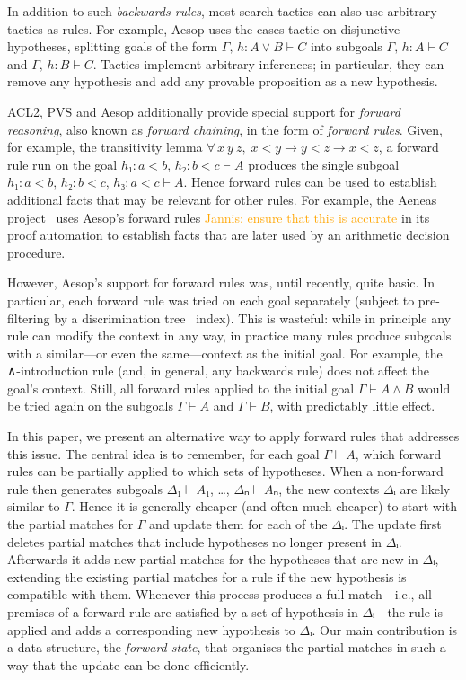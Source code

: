 \documentclass[runningheads,leqno]{llncs}
\newcommand{\jcom}[1]{{\textcolor{orange}{Jannis: #1}} }
\newcommand{\All}[2]{\ensuremath{\forall\, #1,\; #2}}
\begin{document}
In addition to such \emph{backwards rules}, most search tactics can also use arbitrary tactics as rules.
For example, Aesop uses the cases tactic on disjunctive hypotheses, splitting goals of the form $Γ,\, h : A ∨ B ⊢ C$ into subgoals $Γ,\, h : A ⊢ C$ and $Γ,\, h : B ⊢ C$.
Tactics implement arbitrary inferences; in particular, they can remove any hypothesis and add any provable proposition as a new hypothesis.

ACL2, PVS and Aesop additionally provide special support for \emph{forward reasoning}, also known as \emph{forward chaining}, in the form of \emph{forward rules}.
Given, for example, the transitivity lemma $\All{x~y~z}{x < y → y < z → x < z}$, a forward rule run on the goal $h₁ : a < b,\, h₂ : b < c ⊢ A$ produces the single subgoal $h₁ : a < b,\, h₂ : b < c,\, h₃ : a < c ⊢ A$.
Hence forward rules can be used to establish additional facts that may be relevant for other rules.
For example, the Aeneas project~\cite{Aeneas} uses Aesop's forward rules \jcom{ensure that this is accurate} in its proof automation to establish facts that are later used by an arithmetic decision procedure.

However, Aesop's support for forward rules was, until recently, quite basic.
In particular, each forward rule was tried on each goal separately (subject to pre-filtering by a discrimination tree~\cite{DiscriminationTrees} index).
This is wasteful: while in principle any rule can modify the context in any way, in practice many rules produce subgoals with a similar---or even the same---context as the initial goal.
For example, the ∧-introduction rule (and, in general, any backwards rule) does not affect the goal's context.
Still, all forward rules applied to the initial goal $Γ ⊢ A ∧ B$ would be tried again on the subgoals $Γ ⊢ A$ and $Γ ⊢ B$, with predictably little effect.

In this paper, we present an alternative way to apply forward rules that addresses this issue.
The central idea is to remember, for each goal $Γ ⊢ A$, which forward rules can be partially applied to which sets of hypotheses.
When a non-forward rule then generates subgoals $Δ₁ ⊢ A₁$, \dots, $Δₙ ⊢ Aₙ$, the new contexts $Δᵢ$ are likely similar to $Γ$.
Hence it is generally cheaper (and often much cheaper) to start with the partial matches for $Γ$ and update them for each of the $Δᵢ$.
The update first deletes partial matches that include hypotheses no longer present in $Δᵢ$.
Afterwards it adds new partial matches for the hypotheses that are new in $Δᵢ$, extending the existing partial matches for a rule if the new hypothesis is compatible with them.
Whenever this process produces a full match---i.e., all premises of a forward rule are satisfied by a set of hypothesis in $Δᵢ$---the rule is applied and adds a corresponding new hypothesis to $Δᵢ$.
Our main contribution is a data structure, the \emph{forward state}, that organises the partial matches in such a way that the update can be done efficiently.
\end{document}
